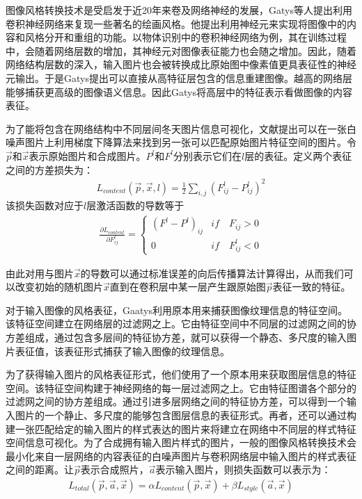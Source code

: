 图像风格转换技术是受启发于近20年来卷及网络神经的发展，Gatys等人\cite{nst}提出利用卷积神经网络来复现一些著名的绘画风格。他提出利用神经元来实现将图像中的内容和风格分开和重组的功能。以物体识别中的卷积神经网络为例，其在训练过程中，会随着网络层数的增加，其神经元对图像表征能力也会随之增加。因此，随着网络结构层数的深入，输入图片也会被转换成比原始图中像素值更具表征性的神经元输出。于是Gatys提出可以直接从高特征层包含的信息重建图像。越高的网络层能够捕获更高级的图像语义信息。因此Gatys将高层中的特征表示看做图像的内容表征。

为了能将包含在网络结构中不同层间冬天图片信息可视化，文献\cite{nst}提出可以在一张白噪声图片上利用梯度下降算法来找到另一张可以匹配原始图片特征空间的图片。令$\overrightarrow{p}$和$\overrightarrow{x}$表示原始图片和合成图片。$P^l$和$F^l$分别表示它们在$l$层的表征。定义两个表征之间的方差损失为：
\begin{align}
    L_{content}(\overrightarrow{p},\overrightarrow{x},l)=\frac{1}{2}\sum_{i,j}(F_{ij}^l-P_{ij}^l)^2
\end{align}
该损失函数对应于$l$层激活函数的导数等于
\begin{align}
    \frac{\partial L_{content}}{\partial F_{ij}^l} = \begin{cases}
        (F^l-P^l)_{ij}  & if \quad F_{ij} > 0 \\
        0 & if \quad F_{ij}^l \lt 0
    \end{cases}
\end{align}

由此对用与图片$\vec{x}$的导数可以通过标准误差的向后传播算法计算得出，从而我们可以改变初始的随机图片$\vec{x}$直到在卷积层中某一层产生跟原始图$\vec{p}$表征一致的特征。

对于输入图像的风格表征，Gaatys利用原本用来捕获图像纹理信息的特征空间。该特征空间建立在网络层的过滤网之上。它由特征空间中不同层的过滤网之间的协方差组成，通过包含多层间的特征协方差，就可以获得一个静态、多尺度的输入图片表征值，该表征形式捕获了输入图像的纹理信息。

为了获得输入图片的风格表征形式，他们使用了一个原本用来获取图层信息的特征空间。该特征空间构建于神经网络的每一层过滤网之上。它由特征图谱各个部分的过滤网之间的协方差组成。通过引进多层网络之间的特征协方差，可以得到一个输入图片的一个静止、多尺度的能够包含图层信息的表征形式。再者，还可以通过构建一张匹配给定的输入图片的样式表达的图片来将建立在网络中不同层的样式特征空间信息可视化。为了合成拥有输入图片样式的图片，一般的图像风格转换技术会最小化来自一层网络的内容表征的白噪声图片与卷积网络层中输入图片的样式表征之间的距离。让$\overrightarrow{p}$表示合成照片，$\overrightarrow{a}$表示输入图片，则损失函数可以表示为：
\begin{align}
    L_{total}(\overrightarrow{p},\overrightarrow{a}, \overrightarrow{x})=
    \alpha L_{content}(\overrightarrow{p}, \overrightarrow{x}) +
    \beta L_{style}(\overrightarrow{a}, \overrightarrow{x})
\end{align}

